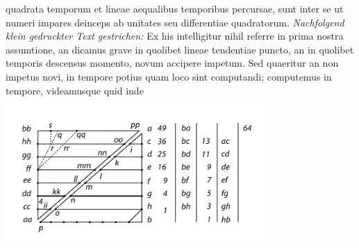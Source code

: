 quadrata temporum et lineae aequalibus temporibus percursae, sunt inter se ut numeri impares deinceps ab unitates seu differentiae quadratorum.
\pend
\vspace{2em} 
\pstart \noindent
\lbrack \textit{Nachfolgend klein gedruckter Text gestrichen:}\rbrack \pend 
\vspace{0.5em} 
\pstart 
\footnotesize
Ex his intelligitur nihil referre in prima nostra assumtione, an dicamus grave\protect{} in quolibet lineae tendentiae\protect{} puncto, an in quolibet temporis descensus momento, novum accipere impetum\protect{}. Sed quaeritur an non impetus novi, in tempore potius quam loco sint computandi; computemus in tempore, videamusque quid inde 
\pend 
\newpage
\pstart
\centering
\includegraphics[trim = 0mm 5mm 0mm 10mm, clip,width=0.75\textwidth]{images/lh03705_128v-d1.pdf}\\
\noindent {}%
